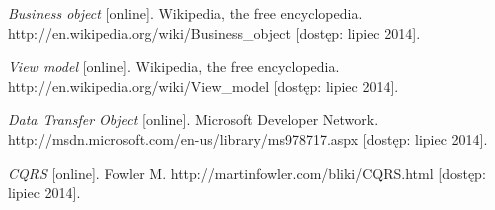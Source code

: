 \begin{thebibliography}{}
  \emph{Business object} [online].
  Wikipedia, the free encyclopedia.
  http://en.wikipedia.org/wiki/Business\_object [dostęp: lipiec 2014].
  
  \emph{View model} [online].
  Wikipedia, the free encyclopedia.
  http://en.wikipedia.org/wiki/View\_model [dostęp: lipiec 2014].
 
  \emph{Data Transfer Object} [online].
  Microsoft Developer Network.
  http://msdn.microsoft.com/en-us/library/ms978717.aspx [dostęp: lipiec 2014].
 
  \emph{CQRS} [online].
  Fowler M.
  http://martinfowler.com/bliki/CQRS.html [dostęp: lipiec 2014].
  
\end{thebibliography}
